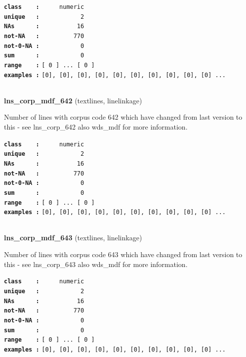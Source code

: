 \documentclass[]{article}
\begin{document}
\textbf{\texttt{class\ \ \ \ :}} \texttt{~~~~~numeric}\\
\textbf{\texttt{unique\ \ \ :}} \texttt{~~~~~~~~~~~2}\\
\textbf{\texttt{NAs\ \ \ \ \ \ :}} \texttt{~~~~~~~~~~16}\\
\textbf{\texttt{not-NA\ \ \ :}} \texttt{~~~~~~~~~770}\\
\textbf{\texttt{not-0-NA\ :}} \texttt{~~~~~~~~~~~0}\\
\textbf{\texttt{sum\ \ \ \ \ \ :}} \texttt{~~~~~~~~~~~0}\\
\textbf{\texttt{range\ \ \ \ :}}
\texttt{{[}\ 0\ {]}\ ...\ {[}\ 0\ {]}}\\
\textbf{\texttt{examples\ :}}
\texttt{{[}0{]},\ {[}0{]},\ {[}0{]},\ {[}0{]},\ {[}0{]},\ {[}0{]},\ {[}0{]},\ {[}0{]},\ {[}0{]},\ {[}0{]}\ ...}\\

~

\textbf{lns\_corp\_mdf\_642} (textlines, linelinkage)

Number of lines with corpus code 642 which have changed from last
version to this - see lns\_corp\_642 also wds\_mdf for more information.

\textbf{\texttt{class\ \ \ \ :}} \texttt{~~~~~numeric}\\
\textbf{\texttt{unique\ \ \ :}} \texttt{~~~~~~~~~~~2}\\
\textbf{\texttt{NAs\ \ \ \ \ \ :}} \texttt{~~~~~~~~~~16}\\
\textbf{\texttt{not-NA\ \ \ :}} \texttt{~~~~~~~~~770}\\
\textbf{\texttt{not-0-NA\ :}} \texttt{~~~~~~~~~~~0}\\
\textbf{\texttt{sum\ \ \ \ \ \ :}} \texttt{~~~~~~~~~~~0}\\
\textbf{\texttt{range\ \ \ \ :}}
\texttt{{[}\ 0\ {]}\ ...\ {[}\ 0\ {]}}\\
\textbf{\texttt{examples\ :}}
\texttt{{[}0{]},\ {[}0{]},\ {[}0{]},\ {[}0{]},\ {[}0{]},\ {[}0{]},\ {[}0{]},\ {[}0{]},\ {[}0{]},\ {[}0{]}\ ...}\\

~

\textbf{lns\_corp\_mdf\_643} (textlines, linelinkage)

Number of lines with corpus code 643 which have changed from last
version to this - see lns\_corp\_643 also wds\_mdf for more information.

\textbf{\texttt{class\ \ \ \ :}} \texttt{~~~~~numeric}\\
\textbf{\texttt{unique\ \ \ :}} \texttt{~~~~~~~~~~~2}\\
\textbf{\texttt{NAs\ \ \ \ \ \ :}} \texttt{~~~~~~~~~~16}\\
\textbf{\texttt{not-NA\ \ \ :}} \texttt{~~~~~~~~~770}\\
\textbf{\texttt{not-0-NA\ :}} \texttt{~~~~~~~~~~~0}\\
\textbf{\texttt{sum\ \ \ \ \ \ :}} \texttt{~~~~~~~~~~~0}\\
\textbf{\texttt{range\ \ \ \ :}}
\texttt{{[}\ 0\ {]}\ ...\ {[}\ 0\ {]}}\\
\textbf{\texttt{examples\ :}}
\texttt{{[}0{]},\ {[}0{]},\ {[}0{]},\ {[}0{]},\ {[}0{]},\ {[}0{]},\ {[}0{]},\ {[}0{]},\ {[}0{]},\ {[}0{]}\ ...}\\
\end{document}
